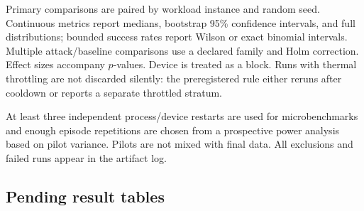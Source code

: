 Primary comparisons are paired by workload instance and random seed. Continuous metrics report medians, bootstrap 95\% confidence intervals, and full distributions; bounded success rates report Wilson or exact binomial intervals. Multiple attack/baseline comparisons use a declared family and Holm correction. Effect sizes accompany $p$-values. Device is treated as a block. Runs with thermal throttling are not discarded silently: the preregistered rule either reruns after cooldown or reports a separate throttled stratum.

At least three independent process/device restarts are used for microbenchmarks and enough episode repetitions are chosen from a prospective power analysis based on pilot variance. Pilots are not mixed with final data. All exclusions and failed runs appear in the artifact log.

\subsection{Pending result tables}

\begin{table}[t]
\centering
\caption{\textbf{Placeholder / expected trend only; replace with actual experimental results before submission.} No numeric outcomes are populated.}
\label{tab:pending-security}
\small
{}
\end{table}

